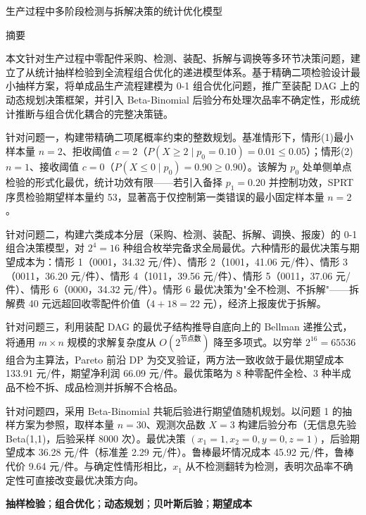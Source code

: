 \documentclass[12pt,a4paper]{ctexart}
\begin{document}
\begin{titlepage}
\thispagestyle{plain}
\centering
{\heiti 生产过程中多阶段检测与拆解决策的统计优化模型\par}
\vspace{0.5cm}
{\heiti 摘\hspace{2em}要\par}
\vspace{0.2cm}

\begin{minipage}{0.95\textwidth}
\setlength{\parindent}{2em}

本文针对生产过程中零配件采购、检测、装配、拆解与调换等多环节决策问题，建立了从统计抽样检验到全流程组合优化的递进模型体系。基于精确二项检验设计最小抽样方案，将单成品生产流程建模为 0-1 组合优化问题，推广至装配 DAG 上的动态规划决策框架，并引入 Beta-Binomial 后验分布处理次品率不确定性，形成统计推断与组合优化耦合的完整决策链。

针对问题一，构建带精确二项尾概率约束的整数规划。基准情形下，情形(1)最小样本量 $n=2$、拒收阈值 $c=2$（$P(X\ge 2\mid p_0=0.10)=0.01\le 0.05$）；情形(2) $n=1$、接收阈值 $c=0$（$P(X\le 0\mid p_0)=0.90\ge 0.90$）。该解为 $p_0$ 处单侧单点检验的形式化最优，统计功效有限——若引入备择 $p_1=0.20$ 并控制功效，SPRT 序贯检验期望样本量约 53，显著高于仅控制第一类错误的最小固定样本量 $n=2$。

针对问题二，构建六类成本分层（采购、检测、装配、拆解、调换、报废）的 0-1 组合决策模型，对 $2^4=16$ 种组合枚举完备求全局最优。六种情形的最优决策与期望成本为：情形 1（0001，34.32 元/件）、情形 2（1001，41.06 元/件）、情形 3（0011，36.20 元/件）、情形 4（1011，39.56 元/件）、情形 5（0011，37.06 元/件）、情形 6（0000，34.32 元/件）。情形 6 最优决策为"全不检测、不拆解"——拆解费 40 元远超回收零配件价值（$4+18=22$ 元），经济上报废优于拆解。

针对问题三，利用装配 DAG 的最优子结构推导自底向上的 Bellman 递推公式，将通用 $m\times n$ 规模的求解复杂度从 $O(2^{\text{节点数}})$ 降至多项式。以穷举 $2^{16}=65536$ 组合为主算法，Pareto 前沿 DP 为交叉验证，两方法一致收敛于最优期望成本 133.91 元/件，期望净利润 66.09 元/件。最优策略为 8 种零配件全检、3 种半成品不检不拆、成品检测并拆解不合格品。

针对问题四，采用 Beta-Binomial 共轭后验进行期望值随机规划。以问题 1 的抽样方案为参照，取样本量 $n=30$、观测次品数 $X=3$ 构建后验分布（无信息先验 Beta(1,1)，后验采样 8000 次）。最优决策 $(x_1=1,x_2=0,y=0,z=1)$，后验期望成本 36.28 元/件（标准差 2.29 元/件）。鲁棒最坏情况成本 45.92 元/件，鲁棒代价 9.64 元/件。与确定性情形相比，$x_1$ 从不检测翻转为检测，表明次品率不确定性可直接改变最优决策方向。

\vspace{0.3cm}
\textbf{抽样检验}；\textbf{组合优化}；\textbf{动态规划}；\textbf{贝叶斯后验}；\textbf{期望成本}
\label{abstract:end}
\end{minipage}
\end{titlepage}
\end{document}
